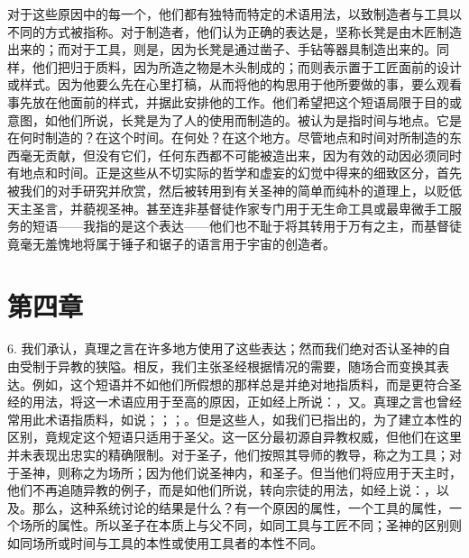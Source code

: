 对于这些原因中的每一个，他们都有独特而特定的术语用法，以致制造者与工具以不同的方式被指称。对于制造者，他们认为正确的表达是，坚称长凳是由木匠制造出来的；而对于工具，则是，因为长凳是通过凿子、手钻等器具制造出来的。同样，他们把归于质料，因为所造之物是木头制成的；而则表示置于工匠面前的设计或样式。因为他要么先在心里打稿，从而将他的构思用于他所要做的事，要么观看事先放在他面前的样式，并据此安排他的工作。他们希望把这个短语局限于目的或意图，如他们所说，长凳是为了人的使用而制造的。被认为是指时间与地点。它是在何时制造的？在这个时间。在何处？在这个地方。尽管地点和时间对所制造的东西毫无贡献，但没有它们，任何东西都不可能被造出来，因为有效的动因必须同时有地点和时间。正是这些从不切实际的哲学和虚妄的幻觉中得来的细致区分，首先被我们的对手研究并欣赏，然后被转用到有关圣神的简单而纯朴的道理上，以贬低天主圣言，并藐视圣神。甚至连非基督徒作家专门用于无生命工具或最卑微手工服务的短语——我指的是这个表达——他们也不耻于将其转用于万有之主，而基督徒竟毫无羞愧地将属于锤子和锯子的语言用于宇宙的创造者。\par


\section{第四章}

\par

6. 我们承认，真理之言在许多地方使用了这些表达；然而我们绝对否认圣神的自由受制于异教的狭隘。相反，我们主张圣经根据情况的需要，随场合而变换其表达。例如，这个短语并不如他们所假想的那样总是并绝对地指质料，而是更符合圣经的用法，将这一术语应用于至高的原因，正如经上所说：，又。真理之言也曾经常用此术语指质料，如说；；；。但是这些人，如我们已指出的，为了建立本性的区别，竟规定这个短语只适用于圣父。这一区分最初源自异教权威，但他们在这里并未表现出忠实的精确限制。对于圣子，他们按照其导师的教导，称之为工具；对于圣神，则称之为场所；因为他们说圣神内，和圣子。但当他们将应用于天主时，他们不再追随异教的例子，而是如他们所说，转向宗徒的用法，如经上说：，以及。那么，这种系统讨论的结果是什么？有一个原因的属性，一个工具的属性，一个场所的属性。所以圣子在本质上与父不同，如同工具与工匠不同；圣神的区别则如同场所或时间与工具的本性或使用工具者的本性不同。\par

